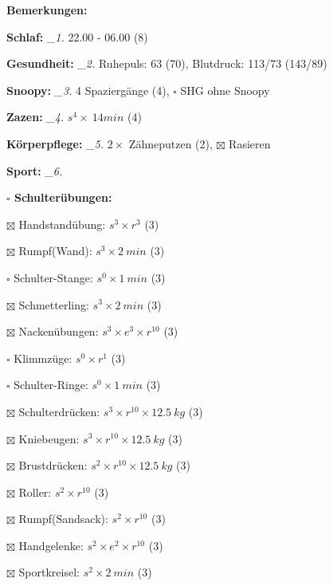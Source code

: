 \documentclass[10pt,a4paper]{article}
\newcommand\prop[1] {{\color {alizarin} {\bf #1}}}             %
\newcommand\mand[1] {{\color {burntorange} {\bf #1}}}          %
\newcommand\topspace{\vskip -15pt \hskip 20pt}
\newcommand\n[1] { {\sl #1.} \hskip 5pt }
\begin{document}
\begin{mdframed}[style=daystyle]
  \begin{labeling}{{\mand {Bemerkungen:}}}
    \setlength\itemsep{-3pt}
  \item[{\mand {Schlaf:}}]        \n{\_1} 22.00 - 06.00 (8)
  \item[{\mand {Gesundheit:}}]    \n{\_2} Ruhepuls: 63 (70), Blutdruck: 113/73 (143/89)
  \item[{\mand {Snoopy:}}]        \n{\_3} 4 Spaziergänge (4), $\square$ SHG ohne Snoopy
  \item[{\mand {Zazen:}}]         \n{\_4} $s^4 \times\ 14 min$ (4)
  \item[{\mand {Körperpflege:}}]  \n{\_5} $2 \times$ Zähneputzen (2), $\boxtimes$ Rasieren
  \item[{\mand {Sport:}}]         \n{\_6}
    \topspace
    \begin{minipage}{0.75\textwidth}  
      \begin{labeling}{\prop {$\square$ {Schulterübungen:}}} 
        \setlength\itemsep{-3pt}
      \item[$\boxtimes$ Handstandübung:]  $s^3 \times r^{3}$ (3)
      \item[$\boxtimes$ Rumpf(Wand):]     $s^3 \times 2\ min$ (3)
      \item[$\square$ Schulter-Stange:] $s^0 \times 1\ min$ (3)
      \item[$\boxtimes$ Schmetterling:]   $s^3 \times 2\ min$ (3)
      \item[$\boxtimes$ Nackenübungen:]   $s^3 \times e^3 \times r^{10}$ (3)
      \item[$\square$ Klimmzüge:]       $s^0 \times r^1$ (3)
      \item[$\square$ Schulter-Ringe:]  $s^0 \times 1\ min$ (3)
      \item[$\boxtimes$ Schulterdrücken:] $s^3 \times r^{10} \times 12.5\ kg$ (3)
      \item[$\boxtimes$ Kniebeugen:]      $s^3 \times r^{10} \times 12.5\ kg$ (3)
      \item[$\boxtimes$ Brustdrücken:]    $s^2 \times r^{10} \times 12.5\ kg$ (3)
      \item[$\boxtimes$ Roller:]          $s^2 \times r^{10}$ (3)
      \item[$\boxtimes$ Rumpf(Sandsack):] $s^2 \times r^{10}$ (3)
      \item[$\boxtimes$ Handgelenke:]     $s^2 \times e^2 \times r^{10}$ (3)
      \item[$\boxtimes$ Sportkreisel:]    $s^2 \times 2\ min$ (3)

\end{labeling}
\end{minipage}
\end{labeling}
\end{mdframed}
\end{document}
